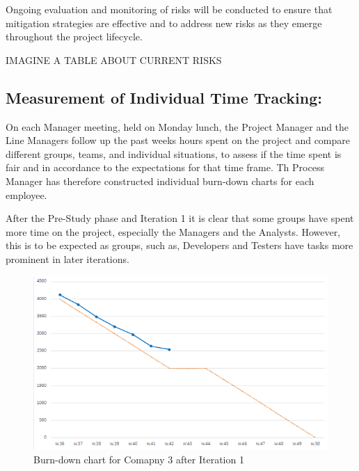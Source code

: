 \documentclass{article}
\begin{document}
Ongoing evaluation and monitoring of risks will be conducted to ensure that mitigation strategies are effective and to address new risks as they emerge throughout the project lifecycle.

IMAGINE A TABLE ABOUT CURRENT RISKS


\subsection{Measurement of Individual Time Tracking: }
On each Manager meeting, held on Monday lunch, the Project Manager and the Line Managers follow up the past weeks hours spent on the project and compare different groups, teams, and individual situations, to assess if the time spent is fair and in accordance to the expectations for that time frame. Th Process Manager has therefore constructed individual burn-down charts for each employee. 

After the Pre-Study phase and Iteration 1 it is clear that some groups have spent more time on the project, especially the Managers and the Analysts. However, this is to be expected as groups, such as, Developers and Testers have tasks more prominent in later iterations.

\begin{figure}[h]
    \centering
    \includegraphics[width=0.5\linewidth]{2024-10-16.png}
    \caption{Burn-down chart for Comapny 3 after Iteration 1}
    \label{fig:enter-label}
\end{figure}
\end{document}
